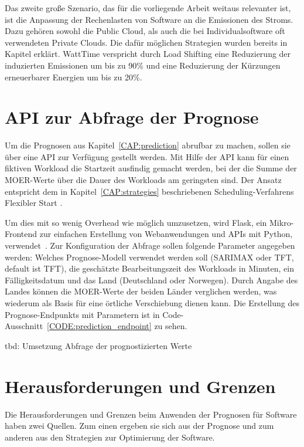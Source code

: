 Das zweite große Szenario, das für die vorliegende Arbeit weitaus relevanter ist, ist die Anpassung der Rechenlasten von Software an die Emissionen des Stroms.
Dazu gehören sowohl die Public Cloud, als auch die bei Individualsoftware oft verwendeten Private Clouds.
Die dafür möglichen Strategien wurden bereits in Kapitel erklärt.
WattTime verspricht durch Load Shifting eine Reduzierung der induzierten Emissionen um bis zu 90\% und eine Reduzierung der Kürzungen erneuerbarer Energien um bis zu 20\%.

\section{API zur Abfrage der Prognose}
Um die Prognosen aus Kapitel~\ref{CAP:prediction} abrufbar zu machen, sollen sie über eine \ac{API} zur Verfügung gestellt werden.
Mit Hilfe der \ac{API} kann für einen fiktiven Workload die Startzeit ausfindig gemacht werden, bei der die Summe der \ac{MOER}-Werte über die Dauer des Workloads am geringsten sind.
Der Ansatz entspricht dem in Kapitel~\ref{CAP:strategies} beschriebenen Scheduling-Verfahrens \glqq Flexibler Start \grqq{}.

Um dies mit so wenig Overhead wie möglich umzusetzen, wird Flask, ein Mikro-Frontend zur einfachen Erstellung von Webanwendungen und \ac{API}s mit Python, verwendet~\cite{.20240203T21:13:11.000Z}.
Zur Konfiguration der Abfrage sollen folgende Parameter angegeben werden:
Welches Prognose-Modell verwendet werden soll (SARIMAX oder \ac{TFT}, default ist \ac{TFT}), die geschätzte Bearbeitungszeit des Workloads in Minuten, ein Fälligkeitsdatum und das Land (Deutschland oder Norwegen).
Durch Angabe des Landes können die \ac{MOER}-Werte der beiden Länder verglichen werden, was wiederum als Basis für eine örtliche Verschiebung dienen kann.
Die Erstellung des Prognose-Endpunkts mit Parametern ist in Code-Ausschnitt~\ref{CODE:prediction_endpoint} zu sehen.


tbd: Umsetzung Abfrage der prognostizierten Werte
\section{Herausforderungen und Grenzen}
Die Herausforderungen und Grenzen beim Anwenden der Prognosen für Software haben zwei Quellen.
Zum einen ergeben sie sich aus der Prognose und zum anderen aus den Strategien zur Optimierung der Software.

